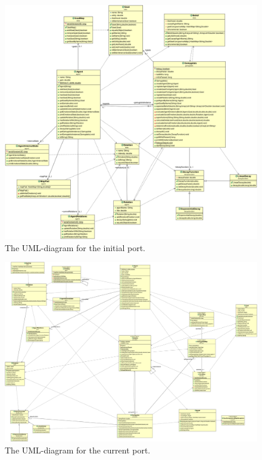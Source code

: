 \begin{figure}
\includegraphics[width=\linewidth]{GAMYGDALA_UML_OLD}
\caption{The UML-diagram for the initial port.}
\end{figure}

\begin{figure}
\includegraphics[width=\linewidth]{GAMYGDALA_UML_NEW}
\caption{The UML-diagram for the current port.}
\end{figure}